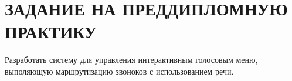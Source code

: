 \chapter{ЗАДАНИЕ НА ПРЕДДИПЛОМНУЮ ПРАКТИКУ}

Разработать систему для управления интерактивным голосовым меню,
выполяющую маршрутизацию звоноков с использованием речи.
